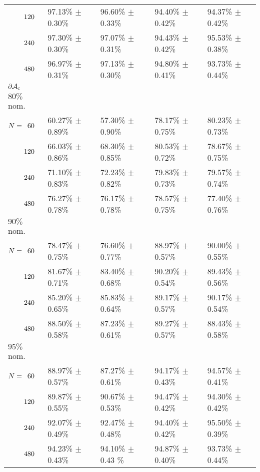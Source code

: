 \begin{table}[htbp]
\begin{tabular}{@{}p{}*{4}{L{\tabcolsep\relax}}@{}}
$\hphantom{N{}={}}120$ & 97.13\% $\pm$ 0.30\% & 96.60\% $\pm$ 0.33\% & 94.40\% $\pm$ 0.42\% & 94.37\% $\pm$ 0.42\% \\[-0.4em]
$\hphantom{N{}={}}240$ & 97.30\% $\pm$ 0.30\% & 97.07\% $\pm$ 0.31\% & 94.43\% $\pm$ 0.42\% & 95.53\% $\pm$ 0.38\% \\[-0.4em]
$\hphantom{N{}={}}480$ & 96.97\% $\pm$ 0.31\% & 97.13\% $\pm$ 0.30\% & 94.80\% $\pm$ 0.41\% & 93.73\% $\pm$ 0.44\%\\
\midrule
$\mathbf{\operatorname{\partial\mathcal{A}_{c}}}$\\[-0.4em]
$80\%$ nom.\\[-0.4em]
$N = \hphantom{1}60$ & 60.27\% $\pm$ 0.89\% & 57.30\% $\pm$ 0.90\% & 78.17\% $\pm$ 0.75\% & 80.23\% $\pm$ 0.73\% \\[-0.4em]
$\hphantom{N{}={}}120$ & 66.03\% $\pm$ 0.86\% & 68.30\% $\pm$ 0.85\% & 80.53\% $\pm$ 0.72\% & 78.67\% $\pm$ 0.75\%\\[-0.4em]
$\hphantom{N{}={}}240$ & 71.10\% $\pm$ 0.83\% & 72.23\% $\pm$ 0.82\% & 79.83\% $\pm$ 0.73\% & 79.57\% $\pm$ 0.74\% \\[-0.4em]
$\hphantom{N{}={}}480$ & 76.27\% $\pm$ 0.78\% & 76.17\% $\pm$ 0.78\% & 78.57\% $\pm$ 0.75\% & 77.40\% $\pm$ 0.76\%\\ 
$90\%$ nom.  \\[-0.4em]
$N = \hphantom{1}60$ & 78.47\% $\pm$ 0.75\% & 76.60\% $\pm$ 0.77\% & 88.97\% $\pm$ 0.57\% & 90.00\% $\pm$ 0.55\% \\[-0.4em]
$\hphantom{N{}={}}120$ & 81.67\% $\pm$ 0.71\% & 83.40\% $\pm$ 0.68\% & 90.20\% $\pm$ 0.54\% & 89.43\% $\pm$ 0.56\% \\[-0.4em]
$\hphantom{N{}={}}240$ & 85.20\% $\pm$ 0.65\% & 85.83\% $\pm$ 0.64\% & 89.17\% $\pm$ 0.57\% & 90.17\% $\pm$ 0.54\% \\[-0.4em]
$\hphantom{N{}={}}480$ & 88.50\% $\pm$ 0.58\% & 87.23\% $\pm$ 0.61\% & 89.27\% $\pm$ 0.57\% & 88.43\% $\pm$ 0.58\%\\ 
$95\%$ nom.  \\[-0.4em]
$N = \hphantom{1}60$ & 88.97\% $\pm$ 0.57\% & 87.27\% $\pm$ 0.61\% & 94.17\% $\pm$ 0.43\% & 94.57\% $\pm$ 0.41\% \\[-0.4em]
$\hphantom{N{}={}}120$ & 89.87\% $\pm$ 0.55\% & 90.67\% $\pm$ 0.53\% & 94.47\% $\pm$ 0.42\% & 94.30\% $\pm$ 0.42\% \\[-0.4em]
$\hphantom{N{}={}}240$ & 92.07\% $\pm$ 0.49\% & 92.47\% $\pm$ 0.48\% & 94.40\% $\pm$ 0.42\% & 95.50\% $\pm$ 0.39\% \\[-0.4em]
$\hphantom{N{}={}}480$ & 94.23\% $\pm$ 0.43\% & 94.10\% $\pm$ 0.43 \% & 94.87\% $\pm$ 0.40\% & 93.73\% $\pm$ 0.44\%\\
\bottomrule
\end{tabular}
\label{tbl:supp_CI_2D_results}
\end{table}

